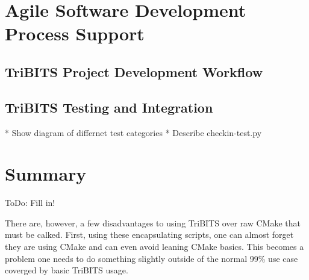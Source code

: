 \documentclass[10pt]{article}
\begin{document}
%
\section{Agile Software Development Process Support}
%


%
\subsection{TriBITS Project Development Workflow}
%


%
\subsection{TriBITS Testing and Integration}
%

* Show diagram of differnet test categories
* Describe checkin-test.py


%
\section{Summary}
%

ToDo: Fill in!

There are, however, a few disadvantages to using TriBITS over raw CMake that must be calked.  First, using these encapsulating scripts, one can almost forget they are using CMake and can even avoid leaning CMake basics.  This becomes a problem one needs to do something slightly outside of the normal 99\% use case coverged by basic TriBITS usage.






\end{document}
